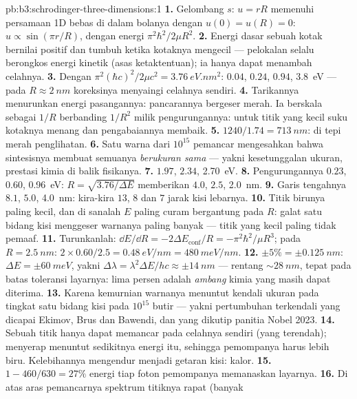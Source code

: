 \begin{solution}{pb:b3:schrodinger-three-dimensions:1}
\textbf{1.} Gelombang $s$: $u = rR$ memenuhi persamaan 1D bebas di dalam
bolanya dengan $u(0) = u(R) = 0$: $u \propto \sin(\pi r/R)$, dengan
energi $\pi^2\hbar^2/2\mu R^2$.
\textbf{2.} Energi dasar sebuah kotak bernilai positif dan tumbuh ketika
kotaknya mengecil --- pelokalan selalu berongkos energi kinetik (asas
ketaktentuan); ia hanya dapat menambah celahnya.
\textbf{3.} Dengan $\pi^2(\hbar c)^2/2\mu c^2 = \qty{3.76}{eV.nm^2}$:
$0.04$, $0.24$, $0.94$, \qty{3.8}{eV} --- pada $R \approx \qty{2}{nm}$
koreksinya menyaingi celahnya sendiri.
\textbf{4.} Tarikannya menurunkan energi pasangannya: pancarannya
bergeser merah. Ia berskala sebagai $1/R$ berbanding $1/R^2$ milik
pengurungannya: untuk titik yang kecil suku kotaknya menang dan
pengabaiannya membaik.
\textbf{5.} $1240/1.74 = \qty{713}{nm}$: di tepi merah penglihatan.
\textbf{6.} Satu warna dari $10^{15}$ pemancar mengesahkan bahwa
sintesisnya membuat semuanya \emph{berukuran sama} --- yakni
kesetunggalan ukuran, prestasi kimia di balik fisikanya.
\textbf{7.} $1.97$, $2.34$, \qty{2.70}{eV}.
\textbf{8.} Pengurungannya $0.23$, $0.60$, \qty{0.96}{eV}: $R =
\sqrt{3.76/\Delta E}$ memberikan $4.0$, $2.5$, \qty{2.0}{nm}.
\textbf{9.} Garis tengahnya $8.1$, $5.0$, \qty{4.0}{nm}: kira-kira $13$,
$8$ dan $7$ jarak kisi lebarnya.
\textbf{10.} Titik birunya paling kecil, dan di sanalah $E$ paling
curam bergantung pada $R$: galat satu bidang kisi menggeser warnanya
paling banyak --- titik yang kecil paling tidak pemaaf.
\textbf{11.} Turunkanlah: $\dd E/\dd R = -2\Delta E_{\text{conf}}/R
= -\pi^2\hbar^2/\mu R^3$; pada $R = \qty{2.5}{nm}$: $2 \times 0.60/2.5
= \qty{0.48}{eV/nm} = \qty{480}{meV/nm}$.
\textbf{12.} $\pm 5\% = \pm\qty{0.125}{nm}$: $\Delta E = \pm
\qty{60}{meV}$, yakni $\Delta\lambda = \lambda^2\Delta E/hc \approx
\pm\qty{14}{nm}$ --- rentang $\sim\qty{28}{nm}$, tepat pada batas
toleransi layarnya: lima persen adalah \emph{ambang} kimia yang masih
dapat diterima.
\textbf{13.} Karena kemurnian warnanya menuntut kendali ukuran pada
tingkat satu bidang kisi pada $10^{15}$ butir --- yakni pertumbuhan
terkendali yang dicapai Ekimov, Brus dan Bawendi, dan yang dikutip
panitia Nobel 2023.
\textbf{14.} Sebuah titik hanya dapat memancar pada celahnya sendiri
(yang terendah); menyerap menuntut sedikitnya energi itu, sehingga
pemompanya harus lebih biru. Kelebihannya mengendur menjadi getaran
kisi: kalor.
\textbf{15.} $1 - 460/630 = 27\%$ energi tiap foton pemompanya
memanaskan layarnya.
\textbf{16.} Di atas aras pemancarnya spektrum titiknya rapat (banyak

\end{solution}
